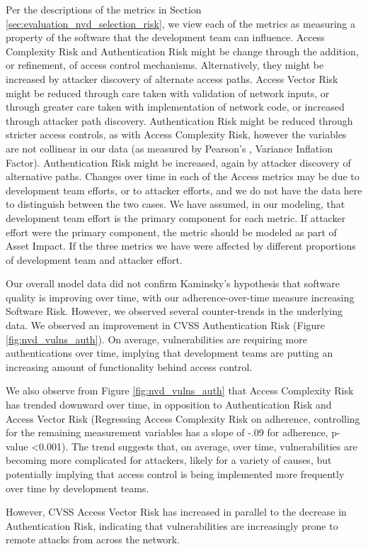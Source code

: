Per the descriptions of the metrics in Section \ref{sec:evaluation_nvd_selection_risk}, we view each of the metrics as measuring a property of the software that the development team can influence. Access Complexity Risk and Authentication Risk might be change through the addition, or refinement, of access control mechanisms. Alternatively, they might be increased by attacker discovery of alternate access paths.   Access Vector Risk might be reduced through care taken with validation of network inputs, or through greater care taken with implementation of network code, or increased through attacker path discovery. Authentication Risk might be reduced through stricter access controls, as with Access Complexity Risk, however the variables are not collinear in our data (as measured by Pearson's , Variance Inflation Factor). Authentication Risk might be increased, again by attacker discovery of alternative paths. Changes over time in each of the Access metrics may be due to development team efforts, or to attacker efforts, and we do not have the data here to distinguish between the two cases. We have assumed, in our modeling, that development team effort is the primary component for each metric. If attacker effort were the primary component, the metric should be modeled as part of Asset Impact.  If the three metrics we have were affected by different proportions of development team and attacker effort.

Our overall model data did not confirm Kaminsky's hypothesis that software quality is improving over time, with our adherence-over-time measure increasing Software Risk. However, we observed several counter-trends in the underlying data. We observed an improvement in CVSS Authentication Risk (Figure \ref{fig:nvd_vulns_auth}). On average, vulnerabilities are requiring more authentications over time, implying that development teams are putting an increasing amount of functionality behind access control.

We also observe from Figure \ref{fig:nvd_vulns_auth} that Access Complexity Risk has trended downward over time, in opposition to Authentication Risk and Access Vector Risk (Regressing Access Complexity Risk on adherence, controlling for the remaining measurement variables has a slope of -.09 for adherence, p-value \textless 0.001). The trend suggests that, on average, over time, vulnerabilities are becoming more complicated for attackers, likely for a variety of causes, but potentially implying that access control is being implemented more frequently over time by development teams.

However, CVSS Access Vector Risk has increased in parallel to the decrease in Authentication Risk, indicating that vulnerabilities are increasingly prone to remote attacks from across the network.